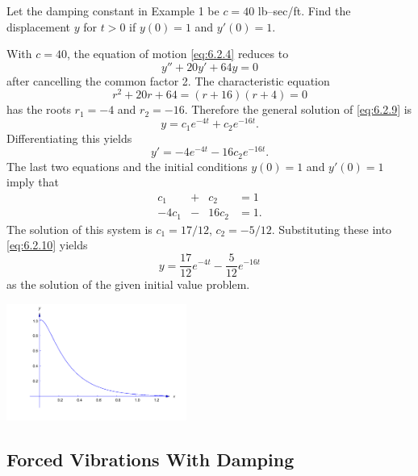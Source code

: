 \documentclass{ximera}
\begin{document}
\begin{example}\label{example:6.2.3}
Let the damping constant in Example 1 be $c=40$ lb--sec/ft. Find the
displacement $y$ for $t>0$ if $y(0)=1$ and $y'(0)=1$.
 
\begin{explanation}
With $c=40$, the equation of motion \eqref{eq:6.2.4} reduces to
\begin{equation}\label{eq:6.2.9}
y''+20y'+64y=0
\end{equation}
 after cancelling the  common factor 2.
The characteristic equation
$$
r^2+20r+64=(r+16)(r+4)=0
$$
 has the roots $r_1=-4$ and $r_2=-16$.  Therefore the general
solution of  \eqref{eq:6.2.9} is
\begin{equation}\label{eq:6.2.10}
y=c_1e^{-4t}+c_2e^{-16t}.
\end{equation}
 Differentiating this yields
$$
y'=-4e^{-4t}-16c_2e^{-16t}.
$$
The last two equations and the initial conditions $y(0)=1$ and $y'(0)=1$
imply that
$$
\begin{array}{rlrl}
c_1&+&c_2&=1\\
-4c_1&-&16c_2&=1.
\end{array}
$$
 The solution of this system is $c_1=17/12$, $c_2=-5/12$.
Substituting these into  \eqref{eq:6.2.10} yields
$$
y=\frac{17}{12}e^{-4t}-\frac{5}{12}e^{-16t}
$$
as the solution of the given initial value problem.
 
\begin{image}
  \includegraphics[height=1.5in]{fig060203.jpg}
\end{image}
 
 
\end{explanation}
\end{example}
 
\subsection{Forced Vibrations With Damping}
 
\end{document}
